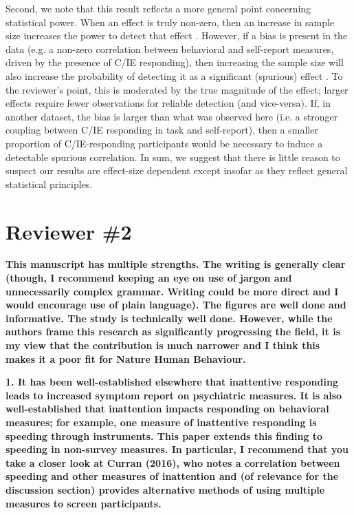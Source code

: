 \documentclass[a4paper,notitlepage,12pt]{article}
\begin{document}
Second, we note that this result reflects a more general point concerning statistical power. When an effect is truly non-zero, then an increase in sample size increases the power to detect that effect \cite{cohen2013statistical}. However, if a bias is present in the data (e.g. a non-zero correlation between behavioral and self-report measures, driven by the presence of C/IE responding), then increasing the sample size will also increase the probability of detecting it as a significant (spurious) effect \cite{meng2018statistical}. To the reviewer's point, this is moderated by the true magnitude of the effect; larger effects require fewer observations for reliable detection (and vice-versa). If, in another dataset, the bias is larger than what was observed here (i.e. a stronger coupling between C/IE responding in task and self-report), then a smaller proportion of C/IE-responding participants would be necessary to induce a detectable spurious correlation. In sum, we suggest that there is little reason to suspect our results are effect-size dependent except insofar as they reflect general statistical principles. 

\section*{Reviewer \#2}

\textbf{This manuscript has multiple strengths. The writing is generally clear (though, I recommend keeping an eye on use of jargon and unnecessarily complex grammar. Writing could be more direct and I would encourage use of plain language). The figures are well done and informative. The study is technically well done. However, while the authors frame this research as significantly progressing the field, it is my view that the contribution is much narrower and I think this makes it a poor fit for Nature Human Behaviour.}

\textbf{1. It has been well-established elsewhere that inattentive responding leads to increased symptom report on psychiatric measures. It is also well-established that inattention impacts responding on behavioral measures; for example, one measure of inattentive responding is speeding through instruments. This paper extends this finding to speeding in non-survey measures. In particular, I recommend that you take a closer look at Curran (2016), who notes a correlation between speeding and other measures of inattention and (of relevance for the discussion section) provides alternative methods of using multiple measures to screen participants.}
\end{document}
